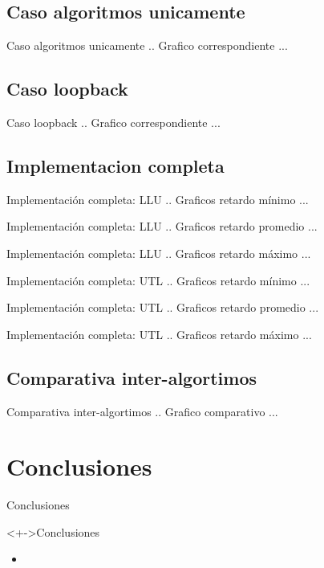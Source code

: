 \documentclass[xcolor=dvipsnames]{beamer}
\begin{document}
\subsection{Caso algoritmos unicamente}
\begin{frame}{Caso algoritmos unicamente} 
 .. Grafico correspondiente ...
\end{frame}

\subsection{Caso loopback}
\begin{frame}{Caso loopback} 
 .. Grafico correspondiente ...
\end{frame}

\subsection{Implementacion completa}
\begin{frame}{Implementación completa: LLU} 
 .. Graficos retardo mínimo ...
\end{frame}


\begin{frame}{Implementación completa: LLU} 
 .. Graficos retardo promedio ...
\end{frame}


\begin{frame}{Implementación completa: LLU} 
 .. Graficos retardo máximo ...
\end{frame}


\begin{frame}{Implementación completa: UTL} 
 .. Graficos retardo mínimo ...
\end{frame}


\begin{frame}{Implementación completa: UTL} 
 .. Graficos retardo promedio ...
\end{frame}


\begin{frame}{Implementación completa: UTL} 
 .. Graficos retardo máximo ...
\end{frame}

\subsection{Comparativa inter-algortimos}
\begin{frame}{Comparativa inter-algortimos} 
 .. Grafico comparativo ...
\end{frame}

\section{Conclusiones}
\begin{frame}{Conclusiones} 
\begin{block}<+->{Conclusiones}   
    \begin{itemize}
      \scriptsize
     	\item     	
    \end{itemize}
  \end{block}
\end{frame}
\end{document}

